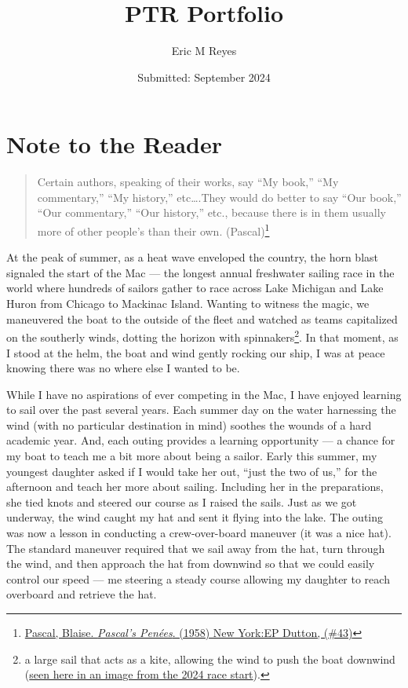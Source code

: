 \documentclass[
  letterpaper,
  DIV=11,
  numbers=noendperiod]{scrreprt}
\title{PTR Portfolio}
\author{Eric M Reyes}
\date{Submitted: September 2024}
\renewcommand*\contentsname{Table of contents}
\newcommand\contentsname{Table of contents}
\begin{document}
\maketitle

\renewcommand*\contentsname{Table of contents}
{
\hypersetup{linkcolor=}
\setcounter{tocdepth}{2}
\tableofcontents
}

\chapter*{Note to the Reader}\label{note-to-the-reader}


\begin{quote}
Certain authors, speaking of their works, say ``My book,'' ``My
commentary,'' ``My history,'' etc\ldots.They would do better to say
``Our book,'' ``Our commentary,'' ``Our history,'' etc., because there
is in them usually more of other people's than their own.
(Pascal)\footnote{\href{https://www.gutenberg.org/files/18269/18269-h/18269-h.htm\#p_43}{Pascal,
  Blaise. \emph{Pascal's Penées}. (1958) New York:EP Dutton, (\#43)}}
\end{quote}

At the peak of summer, as a heat wave enveloped the country, the horn
blast signaled the start of the Mac --- the longest annual freshwater
sailing race in the world where hundreds of sailors gather to race
across Lake Michigan and Lake Huron from Chicago to Mackinac Island.
Wanting to witness the magic, we maneuvered the boat to the outside of
the fleet and watched as teams capitalized on the southerly winds,
dotting the horizon with spinnakers\footnote{a large sail that acts as a
  kite, allowing the wind to push the boat downwind
  (\href{https://drive.google.com/file/d/1NrW5GJNlNJxoZi73NggF7sHlc6oJlpdx/view?usp=sharing}{seen
  here in an image from the 2024 race start}).}. In that moment, as I
stood at the helm, the boat and wind gently rocking our ship, I was at
peace knowing there was no where else I wanted to be.

While I have no aspirations of ever competing in the Mac, I have enjoyed
learning to sail over the past several years. Each summer day on the
water harnessing the wind (with no particular destination in mind)
soothes the wounds of a hard academic year. And, each outing provides a
learning opportunity --- a chance for my boat to teach me a bit more
about being a sailor. Early this summer, my youngest daughter asked if I
would take her out, ``just the two of us,'' for the afternoon and teach
her more about sailing. Including her in the preparations, she tied
knots and steered our course as I raised the sails. Just as we got
underway, the wind caught my hat and sent it flying into the lake. The
outing was now a lesson in conducting a crew-over-board maneuver (it was
a nice hat). The standard maneuver required that we sail away from the
hat, turn through the wind, and then approach the hat from downwind so
that we could easily control our speed --- me steering a steady course
allowing my daughter to reach overboard and retrieve the hat.
\end{document}
